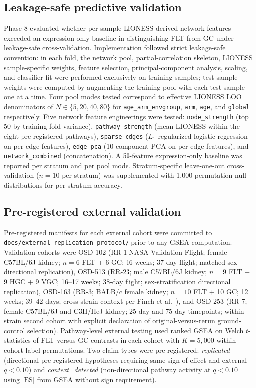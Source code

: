 \documentclass[11pt]{article}
\newcommand{\code}[1]{\texttt{#1}}
\begin{document}
\subsection{Leakage-safe predictive validation}

Phase 8 evaluated whether per-sample LIONESS-derived network features exceeded an expression-only baseline in distinguishing FLT from GC under leakage-safe cross-validation. Implementation followed strict leakage-safe convention: in each fold, the network pool, partial-correlation skeleton, LIONESS sample-specific weights, feature selection, principal-component analysis, scaling, and classifier fit were performed exclusively on training samples; test sample weights were computed by augmenting the training pool with each test sample one at a time. Four pool modes tested correspond to effective LIONESS LOO denominators of $N\in\{5, 20, 40, 80\}$ for \code{age\_arm\_envgroup}, \code{arm}, \code{age}, and \code{global} respectively. Five network feature engineerings were tested: \code{node\_strength} (top 50 by training-fold variance), \code{pathway\_strength} (mean LIONESS within the eight pre-registered pathways), \code{sparse\_edges} ($L_1$-regularized logistic regression on per-edge features), \code{edge\_pca} (10-component PCA on per-edge features), and \code{network\_combined} (concatenation). A 50-feature expression-only baseline was reported per stratum and per pool mode. Stratum-specific leave-one-out cross-validation ($n{=}10$ per stratum) was supplemented with 1{,}000-permutation null distributions for per-stratum accuracy.

\subsection{Pre-registered external validation}

Pre-registered manifests for each external cohort were committed to \code{docs/external\_replication\_protocol/} prior to any GSEA computation. Validation cohorts were OSD-102 (RR-1 NASA Validation Flight; female C57BL/6J kidney; $n{=}6$ FLT + 6 GC; 16 weeks; 37-day flight; matched-sex directional replication), OSD-513 (RR-23; male C57BL/6J kidney; $n{=}9$ FLT + 9 HGC + 9 VGC; 16--17 weeks; 38-day flight; sex-stratification directional replication), OSD-163 (RR-3; BALB/c female kidney; $n{=}10$ FLT + 10 GC; 12 weeks; 39--42 days; cross-strain context per Finch et al.\ \citep{finch2025strain}), and OSD-253 (RR-7; female C57BL/6J and C3H/HeJ kidney; 25-day and 75-day timepoints; within-strain second cohort with explicit declaration of original-versus-rerun ground-control selection). Pathway-level external testing used ranked GSEA \citep{subramanian2005gene} on Welch $t$-statistics of FLT-versus-GC contrasts in each cohort with $K{=}5{,}000$ within-cohort label permutations. Two claim types were pre-registered: \emph{replicated} (directional pre-registered hypotheses requiring same sign of effect and external $q < 0.10$) and \emph{context\_detected} (non-directional pathway activity at $q < 0.10$ using $|\mathrm{ES}|$ from GSEA without sign requirement).
\end{document}
